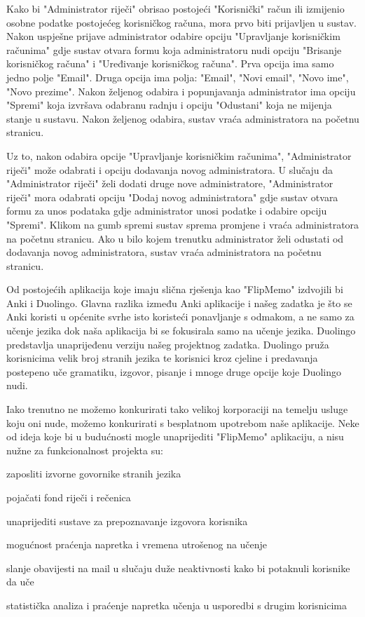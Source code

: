 Kako bi "Administrator riječi" obrisao postojeći "Korisnički" račun ili izmijenio osobne podatke postojećeg korisničkog računa, mora prvo biti prijavljen u sustav. Nakon uspješne prijave administrator odabire opciju "Upravljanje korisničkim računima" gdje sustav otvara formu koja administratoru nudi opciju "Brisanje korisničkog računa" i "Uređivanje korisničkog računa". Prva opcija ima samo jedno polje "Email". Druga opcija ima polja: "Email", "Novi email", "Novo ime", "Novo prezime". Nakon željenog odabira i popunjavanja administrator ima opciju "Spremi" koja izvršava odabranu radnju i opciju "Odustani" koja ne mijenja stanje u sustavu. Nakon željenog odabira, sustav vraća administratora na početnu stranicu.

Uz to, nakon odabira opcije "Upravljanje korisničkim računima", "Administrator riječi" može odabrati i opciju dodavanja novog administratora. U slučaju da "Administrator riječi" želi dodati druge nove administratore, "Administrator riječi" mora odabrati opciju "Dodaj novog administratora" gdje sustav otvara formu za unos podataka gdje administrator unosi podatke i odabire opciju "Spremi". Klikom na gumb spremi sustav sprema promjene i vraća administratora na početnu stranicu. 
Ako u bilo kojem trenutku administrator želi odustati od dodavanja novog administratora, sustav vraća administratora na početnu stranicu.

Od postojećih aplikacija koje imaju slična rješenja kao "FlipMemo" izdvojili bi Anki i Duolingo. Glavna razlika između Anki aplikacije i našeg zadatka je što se Anki koristi u općenite svrhe isto koristeći ponavljanje s odmakom, a ne samo za učenje jezika dok naša aplikacija bi se fokusirala samo na učenje jezika. Duolingo predstavlja unaprijeđenu verziju našeg projektnog zadatka. Duolingo pruža korisnicima velik broj stranih jezika te korisnici kroz cjeline i predavanja postepeno uče gramatiku, izgovor, pisanje i mnoge druge opcije koje Duolingo nudi. 

Iako trenutno ne možemo konkurirati tako velikoj korporaciji na temelju usluge koju oni nude, možemo konkurirati s besplatnom upotrebom naše aplikacije. Neke od ideja koje bi u budućnosti mogle unaprijediti "FlipMemo" aplikaciju, a nisu nužne za funkcionalnost projekta su:

\begin{packed_item}
	\item  zaposliti izvorne govornike stranih jezika 
	\item  pojačati fond riječi i rečenica
	\item  unaprijediti sustave za prepoznavanje izgovora korisnika
	\item  mogućnost praćenja napretka i vremena utrošenog na učenje 
	\item  slanje obavijesti na mail u slučaju duže neaktivnosti kako bi potaknuli korisnike da uče
	\item  statistička analiza i praćenje napretka učenja u usporedbi s drugim korisnicima 
\end{packed_item}

